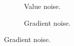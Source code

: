 \begin{figure}[h!]
  \centering

  \begin{subfigure}[b]{0.30\textwidth}
    \caption{Value noise. \cite{value_noise}}
  \end{subfigure}
  \quad
  \quad
  \quad
  \begin{subfigure}[b]{0.30\textwidth}
    \caption{Gradient noise.}
  \end{subfigure}


\end{figure}
